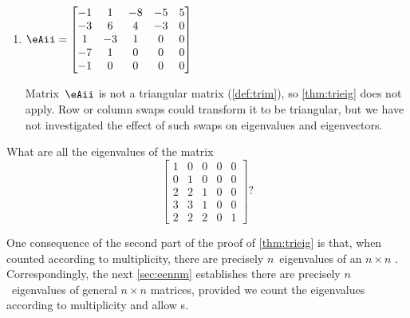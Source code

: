 \begin{example}
\begin{enumerate}
\begin{solution}
\begin{itemize}
\end{itemize}
\end{solution}

\item \(\eAii=\begin{bmatrix} -1&1&-8&-5&5
\\-3&6&4&-3&0
\\1&-3&1&0&0
\\-7&1&0&0&0
\\-1&0&0&0&0 \end{bmatrix}\)
\begin{solution} 
Matrix~\(\eAii\) is not a triangular matrix (\autoref{def:trim}), so \autoref{thm:trieig} does not apply.
Row or column swaps could transform it to be triangular, but we have not investigated the effect of such swaps on eigenvalues and eigenvectors.
\end{solution}
\end{enumerate}
\end{example}




\begin{activity}
What are all the eigenvalues of the matrix
\begin{equation*}
\begin{bmatrix} 1&0&0&0&0
\\0&1&0&0&0
\\2&2&1&0&0
\\3&3&1&0&0
\\2&2&2&0&1
 \end{bmatrix}?
\end{equation*}
\end{activity}






One consequence of the second part of the proof of \autoref{thm:trieig} is that, when counted according to multiplicity, there are precisely \(n\)~eigenvalues of an \(n\times n\) .
Correspondingly, the next \autoref{sec:eennm} establishes there are precisely \(n\)~eigenvalues of general \(n\times n\) matrices, provided we count the eigenvalues according to multiplicity and allow s.










